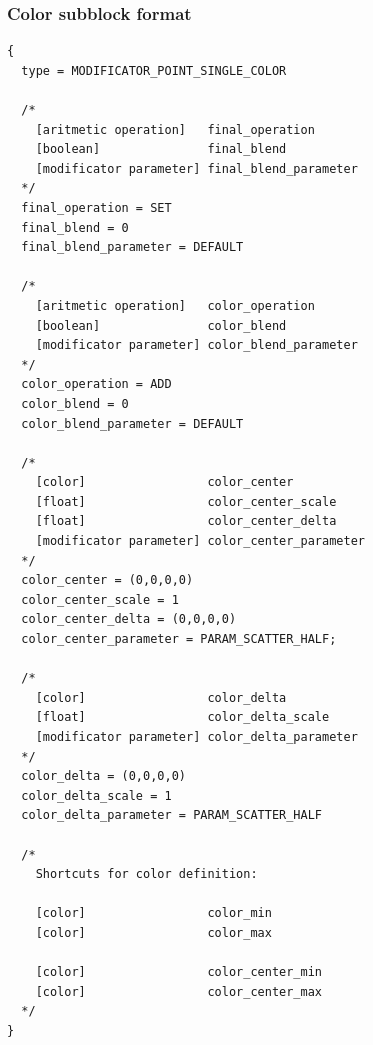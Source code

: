 \documentclass[9pt]{article}
\begin{document}
\subsubsection*{Color subblock format}
\begin{verbatim}
{
  type = MODIFICATOR_POINT_SINGLE_COLOR

  /*  
    [aritmetic operation]   final_operation
    [boolean]               final_blend
    [modificator parameter] final_blend_parameter
  */
  final_operation = SET
  final_blend = 0
  final_blend_parameter = DEFAULT
  
  /*
    [aritmetic operation]   color_operation
    [boolean]               color_blend
    [modificator parameter] color_blend_parameter
  */
  color_operation = ADD
  color_blend = 0
  color_blend_parameter = DEFAULT
  
  /*
    [color]                 color_center
    [float]                 color_center_scale
    [float]                 color_center_delta
    [modificator parameter] color_center_parameter
  */
  color_center = (0,0,0,0)
  color_center_scale = 1
  color_center_delta = (0,0,0,0)
  color_center_parameter = PARAM_SCATTER_HALF;
  
  /*
    [color]                 color_delta
    [float]                 color_delta_scale
    [modificator parameter] color_delta_parameter
  */
  color_delta = (0,0,0,0)
  color_delta_scale = 1
  color_delta_parameter = PARAM_SCATTER_HALF
  
  /*
    Shortcuts for color definition:
    
    [color]                 color_min
    [color]                 color_max

    [color]                 color_center_min
    [color]                 color_center_max
  */  
}
\end{verbatim}
\end{document}
